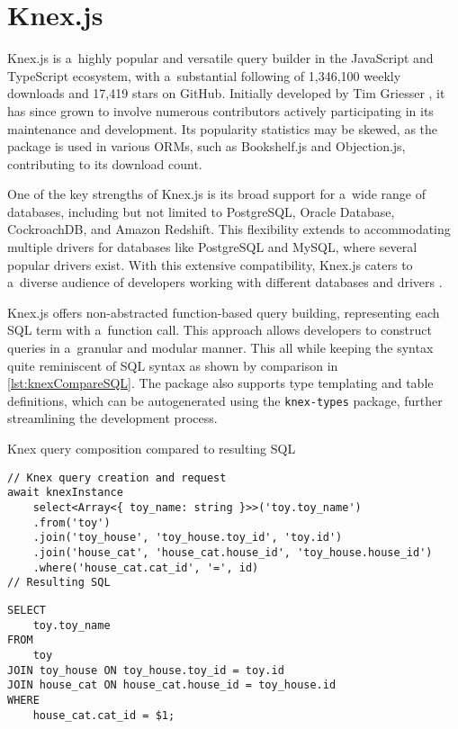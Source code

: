\section{Knex.js}
Knex.js is a~highly popular and versatile query builder in the JavaScript and
TypeScript ecosystem, with a~substantial following of 1,346,100 weekly downloads
and 17,419 stars on GitHub. Initially developed by Tim Griesser
\cite{KnexCommits}, it has since grown to involve numerous contributors actively
participating in its maintenance and development. Its popularity statistics may
be skewed, as the package is used in various ORMs, such as Bookshelf.js and
Objection.js, contributing to its download count.

One of the key strengths of Knex.js is its broad support for a~wide range of
databases, including but not limited to PostgreSQL, Oracle Database,
CockroachDB, and Amazon Redshift. This flexibility extends to accommodating
multiple drivers for databases like PostgreSQL and MySQL, where several popular
drivers exist. With this extensive compatibility, Knex.js caters to a~diverse
audience of developers working with different databases and drivers
\cite{knexDocumentation}.

Knex.js offers non-abstracted function-based query building, representing each
SQL term with a~function call. This approach allows developers to construct
queries in a~granular and modular manner. This all while keeping the syntax
quite reminiscent of SQL syntax as shown by comparison in
\autoref{lst:knexCompareSQL}. The package also supports type templating and
table definitions, which can be autogenerated using the \texttt{knex-types}
\cite{knexTypes} package, further streamlining the development process.

\begin{listing}
    \caption{Knex query composition compared to resulting SQL}
    \label{lst:knexCompareSQL}
\begin{verbatim}
// Knex query creation and request
await knexInstance
    select<Array<{ toy_name: string }>>('toy.toy_name')
    .from('toy')
    .join('toy_house', 'toy_house.toy_id', 'toy.id')
    .join('house_cat', 'house_cat.house_id', 'toy_house.house_id')
    .where('house_cat.cat_id', '=', id)
// Resulting SQL
\end{verbatim} 

\vspace{-\medskipamount}
\vspace{-1.5\baselineskip}
\vspace{0.8pt}%

\begin{verbatim}
SELECT
    toy.toy_name
FROM
    toy
JOIN toy_house ON toy_house.toy_id = toy.id
JOIN house_cat ON house_cat.house_id = toy_house.id
WHERE
    house_cat.cat_id = $1;
\end{verbatim}    
\end{listing}

